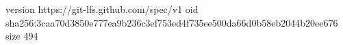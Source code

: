 version https://git-lfs.github.com/spec/v1
oid sha256:3caa70d3850e777ea9b236c3ef753ed4f735ee500da66d0b58eb2044b20ee676
size 494

